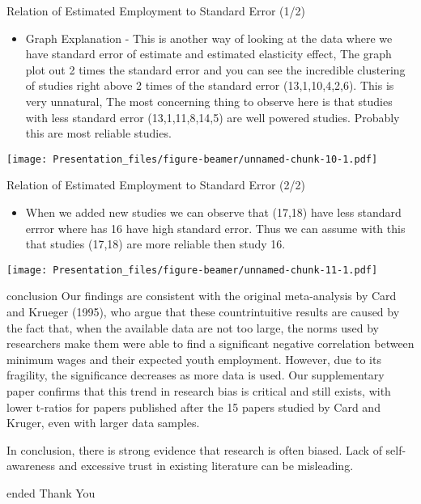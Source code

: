 \documentclass[
  9 pt,
  ignorenonframetext,
]{beamer}
\providecommand{\tightlist}{%
  \setlength{\itemsep}{0pt}\setlength{\parskip}{0pt}}
\begin{document}
\begin{frame}{Relation of Estimated Employment to Standard Error (1/2)}
\protect\hypertarget{relation-of-estimated-employment-to-standard-error-12}{}
\begin{itemize}
\tightlist
\item
  Graph Explanation - This is another way of looking at the data where
  we have standard error of estimate and estimated elasticity effect,
  The graph plot out 2 times the standard error and you can see the
  incredible clustering of studies right above 2 times of the standard
  error (13,1,10,4,2,6). This is very unnatural, The most concerning
  thing to observe here is that studies with less standard error
  (13,1,11,8,14,5) are well powered studies. Probably this are most
  reliable studies.
\end{itemize}

\texttt{[image: Presentation\_files/figure-beamer/unnamed-chunk-10-1.pdf]}
\end{frame}

\begin{frame}{Relation of Estimated Employment to Standard Error (2/2)}
\protect\hypertarget{relation-of-estimated-employment-to-standard-error-22}{}
\begin{itemize}
\tightlist
\item
  When we added new studies we can observe that (17,18) have less
  standard errror where has 16 have high standard error. Thus we can
  assume with this that studies (17,18) are more reliable then study 16.
\end{itemize}

\texttt{[image: Presentation\_files/figure-beamer/unnamed-chunk-11-1.pdf]}
\end{frame}

\begin{frame}{conclusion}
\protect\hypertarget{conclusion}{}
Our findings are consistent with the original meta-analysis by Card and
Krueger (1995), who argue that these countrintuitive results are caused
by the fact that, when the available data are not too large, the norms
used by researchers make them were able to find a significant negative
correlation between minimum wages and their expected youth employment.
However, due to its fragility, the significance decreases as more data
is used. Our supplementary paper confirms that this trend in research
bias is critical and still exists, with lower t-ratios for papers
published after the 15 papers studied by Card and Kruger, even with
larger data samples.

In conclusion, there is strong evidence that research is often biased.
Lack of self-awareness and excessive trust in existing literature can be
misleading.
\end{frame}

\begin{frame}{ended}
\protect\hypertarget{ended}{}
\centering  Thank You
\end{frame}
\end{document}
